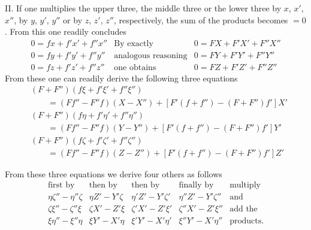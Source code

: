 II. If one multiplies the upper three, the middle three or the lower three by $x$, $x'$, $x''$, by $y$, $y'$, $y''$ or by $z$, $z'$, $z''$, respectively, the sum of the products becomes $=0$. From this one readily concludes
\[
\begin{array}{r|c|l}
0=fx+f'x'+f''x''&\text{By exactly}&0=FX+F'X'+F''X''\\
0=fy+f'y'+f''y''&\text{analogous reasoning}&0=FY+F'Y'+F''Y''\\
0=fz+f'z'+f''z''&\text{one obtains}&0=FZ+F'Z'+F''Z''
\end{array}
\]
%
From these one can readily derive the following three equations
\[
\begin{aligned}
&(F+F'')(f\xi+f'\xi'+f''\xi'')\\
&\qquad=(Ff''-F''f)(X-X'')+[F'(f+f'')-(F+F'')f']X'\\
&(F+F'')(f\eta+f'\eta'+f''\eta'')\\
&\qquad=(Ff''-F''f)(Y-Y'')+[F'(f+f'')-(F+F'')f']Y'\\
&(F+F'')(f\zeta+f'\zeta'+f''\zeta'')\\
&\qquad=(Ff''-F''f)(Z-Z'')+[F'(f+f'')-(F+F'')f']Z'
\end{aligned}
\]

From these three equations we derive four others as follows
\[
\begin{array}{c|c|c|c|l}
\text{first by}&\text{then by}&\text{then by}&\text{finally by}&\text{multiply}\\
\eta\zeta''-\eta''\zeta&\eta Z'-Y'\zeta&\eta'Z'-Y'\zeta'&\eta''Z'-Y'\zeta''&\text{and}\\
\zeta\xi''-\zeta''\xi&\zeta X'-Z'\xi&\zeta'X'-Z'\xi'&\zeta''X'-Z'\xi''&\text{add the}\\
\xi\eta''-\xi''\eta&\xi Y'-X'\eta&\xi'Y'-X'\eta'&\xi''Y'-X'\eta''&\text{products.}
\end{array}
\]

